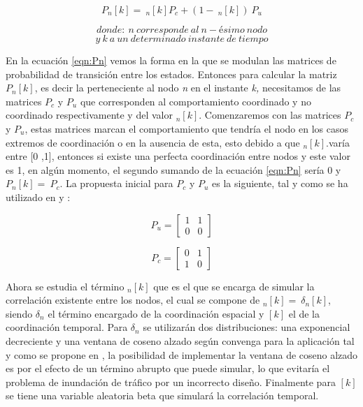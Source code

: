 \begin{equation}
P_n\left[k\right]=\ _n\left[k\right] P_c+\left(1-\ _n\left[k\right]\right)\ P_u 
\label{eqn:Pn}
\end{equation}

\[donde:\ n\ corresponde\ al\ n-\textrm{é}simo\ nodo\] 
\[y\ k\ a\ un\ determinado\ instante\ de\ tiempo\] 

En la ecuación \ref{eqn:Pn} vemos la forma en la que se modulan las matrices de probabilidad de transición entre los estados. Entonces para calcular la matriz $P_n\left[k\right]$, es decir la perteneciente al nodo \textit{n }en el instante \textit{k, }necesitamos de las matrices $P_c$ y $P_u$ que corresponden al comportamiento coordinado y no coordinado respectivamente y del valor $_n\left[k\right]$. Comenzaremos con las matrices $P_c$ y $P_u$, estas matrices marcan el comportamiento que tendría el nodo en los casos extremos de coordinación o en la ausencia de esta, esto debido a que $_n\left[k\right]$.varía entre [0 ,1], entonces si existe una perfecta coordinación entre nodos y este valor es 1, en algún momento, el segundo sumando de la ecuación \ref{eqn:Pn} sería 0 y $P_n\left[k\right]=\ P_c$. La propuesta inicial para $P_c$ y $P_u$ es la siguiente, tal y como se ha utilizado en \parencite{Gupta2018} y \parencite{Smiljkovic2014}:

\begin{equation}
P_{u} =  
\begin{bmatrix}
1 & 1 \\
0 & 0 
\end{bmatrix}
\end{equation}

\begin{equation}
P_{c} = 
\begin{bmatrix}
0 & 1 \\
1 & 0 
\end{bmatrix}
\end{equation}

Ahora se estudia el término $_n\left[k\right]$ que es el que se encarga de simular la correlación existente entre los nodos, el cual se compone de $_n\left[k\right]=\ {\delta }_n[k]$, siendo ${\delta }_n$ el término encargado de la coordinación espacial y $[k]$ el de la coordinación temporal. Para ${\delta }_n$ se utilizarán dos distribuciones: una exponencial decreciente y una ventana de coseno alzado según convenga para la aplicación tal y como se propone en \parencite{Gupta2018}, la posibilidad de implementar la ventana de coseno alzado es por el efecto de un término abrupto que puede simular, lo que evitaría el problema de inundación de tráfico por un incorrecto diseño. Finalmente para $[k]$ se tiene una variable aleatoria beta\textit{ }que simulará la correlación temporal. \newline


